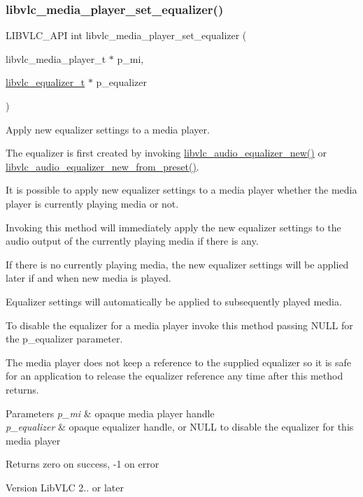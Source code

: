 \subsubsection{\texorpdfstring{libvlc\+\_\+media\+\_\+player\+\_\+set\+\_\+equalizer()}{libvlc\_media\_player\_set\_equalizer()}}
{\footnotesize\ttfamily L\+I\+B\+V\+L\+C\+\_\+\+A\+PI int libvlc\+\_\+media\+\_\+player\+\_\+set\+\_\+equalizer (\begin{DoxyParamCaption}\item[{libvlc\+\_\+media\+\_\+player\+\_\+t $\ast$}]{p\+\_\+mi,  }\item[{\hyperlink{group__libvlc__media__player_ga1ea141a84d68d0147fc58d99bfc83ab7}{libvlc\+\_\+equalizer\+\_\+t} $\ast$}]{p\+\_\+equalizer }\end{DoxyParamCaption})}

Apply new equalizer settings to a media player.

The equalizer is first created by invoking \hyperlink{group__libvlc__audio_gad252fff10bf02bc8436b3beab4badef9}{libvlc\+\_\+audio\+\_\+equalizer\+\_\+new()} or \hyperlink{group__libvlc__audio_ga41d6921b8a10f90c4ad9fd3bf844f035}{libvlc\+\_\+audio\+\_\+equalizer\+\_\+new\+\_\+from\+\_\+preset()}.

It is possible to apply new equalizer settings to a media player whether the media player is currently playing media or not.

Invoking this method will immediately apply the new equalizer settings to the audio output of the currently playing media if there is any.

If there is no currently playing media, the new equalizer settings will be applied later if and when new media is played.

Equalizer settings will automatically be applied to subsequently played media.

To disable the equalizer for a media player invoke this method passing N\+U\+LL for the p\+\_\+equalizer parameter.

The media player does not keep a reference to the supplied equalizer so it is safe for an application to release the equalizer reference any time after this method returns.


\begin{DoxyParams}{Parameters}
{\em p\+\_\+mi} & opaque media player handle \\
\hline
{\em p\+\_\+equalizer} & opaque equalizer handle, or N\+U\+LL to disable the equalizer for this media player \\
\hline
\end{DoxyParams}
\begin{DoxyReturn}{Returns}
zero on success, -\/1 on error 
\end{DoxyReturn}
\begin{DoxyVersion}{Version}
Lib\+V\+LC 2.. or later 
\end{DoxyVersion}
